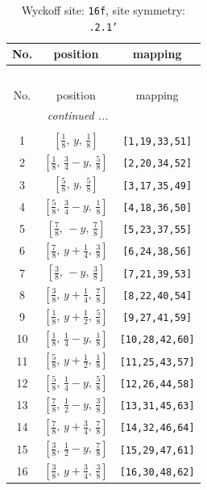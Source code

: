 \documentclass[fleqn,8pt]{jsarticle}
\begin{document}
\renewcommand{\arraystretch}{1.2}
\begin{longtable}{ccc}
\caption{Wyckoff site: {\tt 16f}, site symmetry: {\tt .2.1'}}
 \\
 \hline \hline
No. & position & mapping \\ \hline \endfirsthead

\multicolumn{2}{l}{\tablename\ \thetable{}} \\
 \hline \hline
No. & position & mapping \\ \hline \endhead

 \hline \hline
\multicolumn{2}{r}{\footnotesize\it continued ...} \\ \endfoot

 \hline \hline
\multicolumn{2}{r}{} \\ \endlastfoot

1 & $\left[ \frac{1}{8},\, y,\, \frac{1}{8} \right]$ & {\tt [1,19,33,51]} \\ \hline
2 & $\left[ \frac{1}{8},\, \frac{3}{4} - y,\, \frac{5}{8} \right]$ & {\tt [2,20,34,52]} \\ \hline
3 & $\left[ \frac{5}{8},\, y,\, \frac{5}{8} \right]$ & {\tt [3,17,35,49]} \\ \hline
4 & $\left[ \frac{5}{8},\, \frac{3}{4} - y,\, \frac{1}{8} \right]$ & {\tt [4,18,36,50]} \\ \hline
5 & $\left[ \frac{7}{8},\, - y,\, \frac{7}{8} \right]$ & {\tt [5,23,37,55]} \\ \hline
6 & $\left[ \frac{7}{8},\, y + \frac{1}{4},\, \frac{3}{8} \right]$ & {\tt [6,24,38,56]} \\ \hline
7 & $\left[ \frac{3}{8},\, - y,\, \frac{3}{8} \right]$ & {\tt [7,21,39,53]} \\ \hline
8 & $\left[ \frac{3}{8},\, y + \frac{1}{4},\, \frac{7}{8} \right]$ & {\tt [8,22,40,54]} \\ \hline
9 & $\left[ \frac{1}{8},\, y + \frac{1}{2},\, \frac{5}{8} \right]$ & {\tt [9,27,41,59]} \\ \hline
10 & $\left[ \frac{1}{8},\, \frac{1}{4} - y,\, \frac{1}{8} \right]$ & {\tt [10,28,42,60]} \\ \hline
11 & $\left[ \frac{5}{8},\, y + \frac{1}{2},\, \frac{1}{8} \right]$ & {\tt [11,25,43,57]} \\ \hline
12 & $\left[ \frac{5}{8},\, \frac{1}{4} - y,\, \frac{5}{8} \right]$ & {\tt [12,26,44,58]} \\ \hline
13 & $\left[ \frac{7}{8},\, \frac{1}{2} - y,\, \frac{3}{8} \right]$ & {\tt [13,31,45,63]} \\ \hline
14 & $\left[ \frac{7}{8},\, y + \frac{3}{4},\, \frac{7}{8} \right]$ & {\tt [14,32,46,64]} \\ \hline
15 & $\left[ \frac{3}{8},\, \frac{1}{2} - y,\, \frac{7}{8} \right]$ & {\tt [15,29,47,61]} \\ \hline
16 & $\left[ \frac{3}{8},\, y + \frac{3}{4},\, \frac{3}{8} \right]$ & {\tt [16,30,48,62]} \\
\end{longtable}
\end{document}
